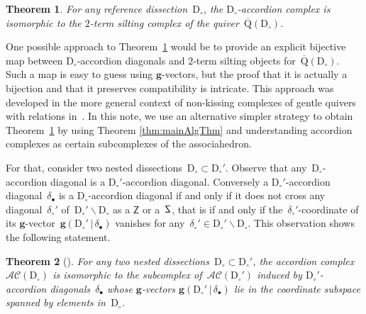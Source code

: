 \documentclass{amsart}
\newtheorem{theorem}{Theorem}%
\theoremstyle{definition}
\renewcommand{\b}[1]{\mathbf{#1}} %
\newcommand{\ssm}{\smallsetminus} %
\newcommand{\dissection}{\mathrm{D}} %
\newcommand{\accordionComplex}{\mathcal{AC}} %
\newcommand{\SSS}{\reflectbox{$\mathsf{Z}$}} %
\newcommand{\ZZZ}{\mathsf{Z}} %
\newcommand{\gvector}[2]{\mathbf{g}(#1 \,|\, #2)} %
\newcommand{\quiver}{\mathrm{Q}} %
\begin{document}
\begin{theorem}
\label{thm:bijectionAccordionComplexSiltingComplex}
For any reference dissection~$\dissection_\circ$, the $\dissection_\circ$-accordion complex is isomorphic to the $2$-term silting complex of the quiver~$\overline{\quiver}(\dissection_\circ)$.
\end{theorem}

One possible approach to Theorem~\ref{thm:bijectionAccordionComplexSiltingComplex} would be to provide an explicit bijective map between $\dissection_\circ$-accordion diagonals and $2$-term silting objects for~$\overline{\quiver}(\dissection_\circ)$.
Such a map is easy to guess using \mbox{$\b{g}$-vectors}, but the proof that it is actually a bijection and that it preserves compatibility is intricate.
This approach was developed in the more general context of non-kissing complexes of gentle quivers with relations in~\cite[Prop.~2.44]{PaluPilaudPlamondon}.
In this note, we use an alternative simpler strategy to obtain Theorem~\ref{thm:bijectionAccordionComplexSiltingComplex} by using Theorem \ref{thm:mainAlgThm} and understanding accordion complexes as certain subcomplexes of the associahedron.

For that, consider two nested dissections~$\dissection_\circ \subset \dissection_\circ'$.
Observe that any~$\dissection_\circ$-accordion diagonal is a $\dissection_\circ'$-accordion diagonal.
Conversely a $\dissection_\circ'$-accordion diagonal~$\delta_\bullet$ is a $\dissection_\circ$-accordion diagonal if and only if it does not cross any diagonal~$\delta_\circ'$ of~$\dissection_\circ' \ssm \dissection_\circ$ as a $\ZZZ$ or a~$\SSS$, that is if and only if the~$\delta_\circ'$-coordinate of its $\b{g}$-vector~$\gvector{\dissection_\circ'}{\delta_\bullet}$ vanishes for any~$\delta_\circ' \in \dissection_\circ' \ssm \dissection_\circ$.
This observation shows the following statement.

\begin{theorem}[{\cite[Sect.~4.2]{MannevillePilaud-accordion}}]
\label{thm:contractDiagonals}
For any two nested dissections~$\dissection_\circ \subset \dissection_\circ'$, the accordion complex~$\accordionComplex(\dissection_\circ)$ is isomorphic to the subcomplex of~$\accordionComplex(\dissection_\circ')$ induced by $\dissection_\circ'$-accordion diagonals~$\delta_\bullet$ whose $\b{g}$-vectors $\gvector{\dissection_\circ'}{\delta_\bullet}$ lie in the coordinate subspace spanned by elements in~$\dissection_\circ$.
\end{theorem}
\end{document}
